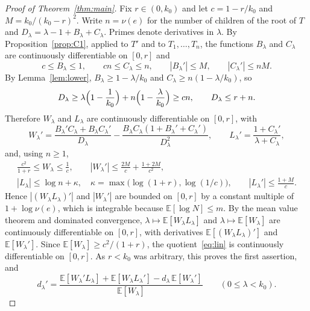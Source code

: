 \documentclass[11pt]{amsart}
\theoremstyle{definition}
\newcommand{\E}{\mathbb{E}}
\begin{document}
\begin{proof}[Proof of Theorem~\ref{thm:main}]
Fix $r\in(0,k_0)$ and let $c=1-r/k_0$ and $M=k_0/(k_0-r)^2$. Write $n=\nu(e)$ for the number of children of the
root of $T$ and $D_\lambda=\lambda-1+B_\lambda+C_\lambda$. Primes denote derivatives in $\lambda$. By
Proposition~\ref{prop:C1}, applied to $T'$ and to $T_1,\dots,T_n$, the functions $B_\lambda$ and $C_\lambda$ are
continuously differentiable on $[0,r]$ and
\[
   c\le B_\lambda\le1,\qquad cn\le C_\lambda\le n,\qquad |B_\lambda'|\le M,\qquad |C_\lambda'|\le nM .
\]
By Lemma~\ref{lem:lower}, $B_\lambda\ge1-\lambda/k_0$ and $C_\lambda\ge n(1-\lambda/k_0)$, so
\[
   D_\lambda\ge\lambda\Bigl(1-\frac1{k_0}\Bigr)+n\Bigl(1-\frac{\lambda}{k_0}\Bigr)\ge cn,
   \qquad D_\lambda\le r+n .
\]
Therefore $W_\lambda$ and $L_\lambda$ are continuously differentiable on $[0,r]$, with
\[
   W_\lambda'=\frac{B_\lambda'C_\lambda+B_\lambda C_\lambda'}{D_\lambda}
     -\frac{B_\lambda C_\lambda(1+B_\lambda'+C_\lambda')}{D_\lambda^2},\qquad
   L_\lambda'=\frac{1+C_\lambda'}{\lambda+C_\lambda},
\]
and, using $n\ge1$,
\begin{gather*}
   \frac{c^2}{1+r}\le W_\lambda\le\frac1c,\qquad
   |W_\lambda'|\le\frac{2M}{c}+\frac{1+2M}{c^2},\\
   |L_\lambda|\le\log n+\kappa,\quad \kappa=\max\bigl(\log(1+r),\log(1/c)\bigr),\qquad
   |L_\lambda'|\le\frac{1+M}{c}.
\end{gather*}
Hence $|(W_\lambda L_\lambda)'|$ and $|W_\lambda'|$ are bounded on $[0,r]$ by a constant multiple of
$1+\log\nu(e)$, which is integrable because $\E[\log N]\le m$. By the mean value theorem and dominated
convergence, $\lambda\mapsto\E[W_\lambda L_\lambda]$ and $\lambda\mapsto\E[W_\lambda]$ are continuously
differentiable on $[0,r]$, with derivatives $\E[(W_\lambda L_\lambda)']$ and $\E[W_\lambda']$. Since
$\E[W_\lambda]\ge c^2/(1+r)$, the quotient~\eqref{eq:lin} is continuously differentiable on $[0,r]$. As
$r<k_0$ was arbitrary, this proves the first assertion, and
\begin{equation}\label{eq:quot}
   d_\lambda'=\frac{\E[W_\lambda'L_\lambda]+\E[W_\lambda L_\lambda']-d_\lambda\,\E[W_\lambda']}{\E[W_\lambda]}
   \qquad(0\le\lambda<k_0).
\end{equation}


\end{proof}
\end{document}
